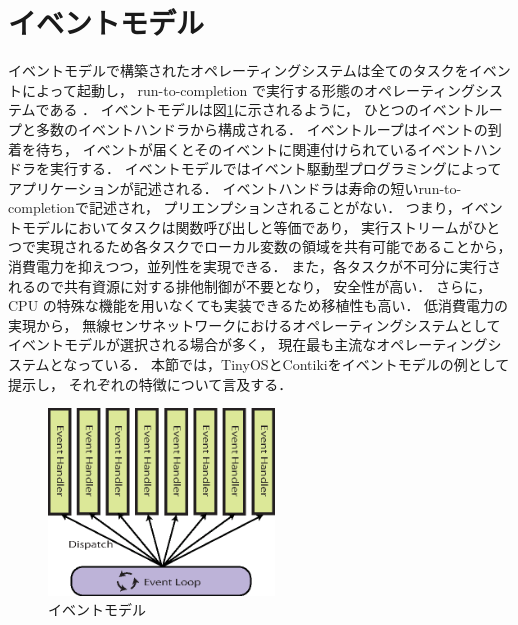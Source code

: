 \section{イベントモデル}\label{sec:event_model}
イベントモデルで構築されたオペレーティングシステムは全てのタスクをイベントによって起動し，
run-to-completion で実行する形態のオペレーティングシステムである
\cite{survey_os}．
イベントモデルは図\ref{fig:event_model}に示されるように，
ひとつのイベントループと多数のイベントハンドラから構成される．
イベントループはイベントの到着を待ち，
イベントが届くとそのイベントに関連付けられているイベントハンドラを実行する．
イベントモデルではイベント駆動型プログラミングによってアプリケーションが記述される．
イベントハンドラは寿命の短いrun-to-completionで記述され，
プリエンプションされることがない．
つまり，イベントモデルにおいてタスクは関数呼び出しと等価であり，
実行ストリームがひとつで実現されるため各タスクでローカル変数の領域を共有可能であることから，
消費電力を抑えつつ，並列性を実現できる．
また，各タスクが不可分に実行されるので共有資源に対する排他制御が不要となり，
安全性が高い．
さらに，CPU の特殊な機能を用いなくても実装できるため移植性も高い．
低消費電力の実現から，
無線センサネットワークにおけるオペレーティングシステムとして
イベントモデルが選択される場合が多く，
現在最も主流なオペレーティングシステムとなっている．
本節では，TinyOSとContikiをイベントモデルの例として提示し，
それぞれの特徴について言及する．

\begin{figure}[htbp]
 \begin{center}
  \includegraphics[width=60mm]{./images/event_model.eps}
 \end{center}
 \caption{イベントモデル}
 \label{fig:event_model}
\end{figure}



